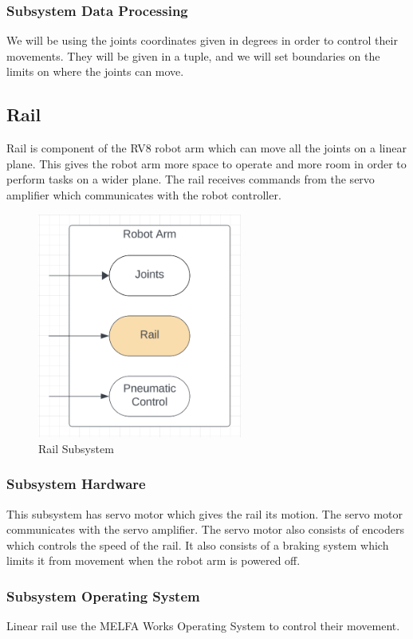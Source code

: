 \subsubsection{Subsystem Data Processing}
We will be using the joints coordinates given in degrees in order to control their movements. They will be given in a tuple, and we will set boundaries on the limits on where the joints can move.


\subsection{Rail}
Rail is component of the RV8 robot arm which can move all the joints on a linear plane. This gives the robot arm more space to operate and more room in order to perform tasks on a wider plane. The rail receives commands from the servo amplifier which communicates with the robot controller.

\begin{figure}[h!]
	\centering
 	\includegraphics[width=0.60\textwidth]{images/rail.png}
 \caption{Rail Subsystem}
\end{figure}

\subsubsection{Subsystem Hardware}
This subsystem has servo motor which gives the rail its motion. The servo motor communicates with the servo amplifier. The servo motor also consists of encoders which controls the speed of the rail. It also consists of a braking system which limits it from movement when the robot arm is powered off.

\subsubsection{Subsystem Operating System}
Linear rail use the MELFA Works Operating System to control their movement.

